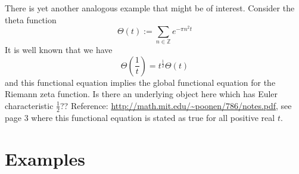 \documentclass[paper=a4, fontsize=11pt]{scrartcl} %
\numberwithin{equation}{section} %
\numberwithin{figure}{section} %
\numberwithin{table}{section} %
\begin{document}
There is yet another analogous example that might be of interest. Consider the theta function
$$ \Theta(t) := \sum_{n \in \mathbb{Z}} e^{-\pi n^2 t}   $$
It is well known that we have
$$ \Theta(\frac{1}{t}) =  t^{\frac{1}{2}} \Theta(t)   $$
and this functional equation implies the global functional equation for the Riemann zeta function. Is there an underlying object here which has Euler characteristic $\frac{1}{2}$??
Reference: \url{http://math.mit.edu/~poonen/786/notes.pdf}, see page 3 where this functional equation is stated as true for all positive real $t$.

\section{Examples}





\end{document}
